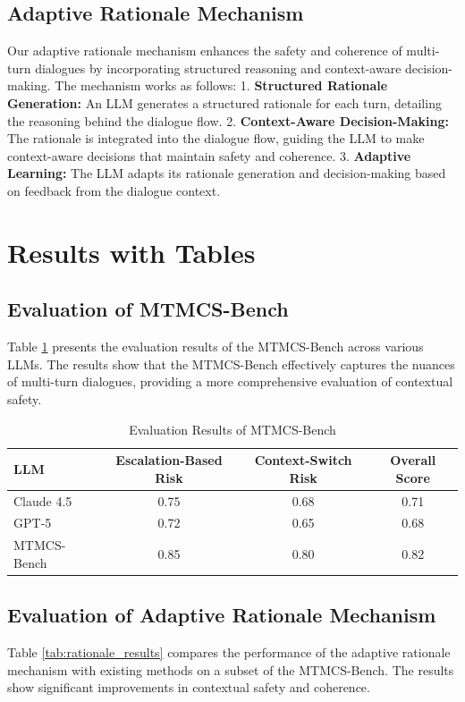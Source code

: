 \documentclass{article}
\begin{document}
\subsection{Adaptive Rationale Mechanism}
Our adaptive rationale mechanism enhances the safety and coherence of multi-turn dialogues by incorporating structured reasoning and context-aware decision-making. The mechanism works as follows:
1. \textbf{Structured Rationale Generation:} An LLM generates a structured rationale for each turn, detailing the reasoning behind the dialogue flow.
2. \textbf{Context-Aware Decision-Making:} The rationale is integrated into the dialogue flow, guiding the LLM to make context-aware decisions that maintain safety and coherence.
3. \textbf{Adaptive Learning:} The LLM adapts its rationale generation and decision-making based on feedback from the dialogue context.

\section{Results with Tables}
\subsection{Evaluation of MTMCS-Bench}
Table \ref{tab:mtmcs_results} presents the evaluation results of the MTMCS-Bench across various LLMs. The results show that the MTMCS-Bench effectively captures the nuances of multi-turn dialogues, providing a more comprehensive evaluation of contextual safety.

\begin{table}[htbp]
\centering
\caption{Evaluation Results of MTMCS-Bench}
\label{tab:mtmcs_results}
\begin{tabular}{|l|c|c|c|}
\hline
\textbf{LLM} & \textbf{Escalation-Based Risk} & \textbf{Context-Switch Risk} & \textbf{Overall Score} \\
\hline
Claude 4.5 & 0.75 & 0.68 & 0.71 \\
GPT-5 & 0.72 & 0.65 & 0.68 \\
MTMCS-Bench & 0.85 & 0.80 & 0.82 \\
\hline
\end{tabular}
\end{table}

\subsection{Evaluation of Adaptive Rationale Mechanism}
Table \ref{tab:rationale_results} compares the performance of the adaptive rationale mechanism with existing methods on a subset of the MTMCS-Bench. The results show significant improvements in contextual safety and coherence.
\end{document}
